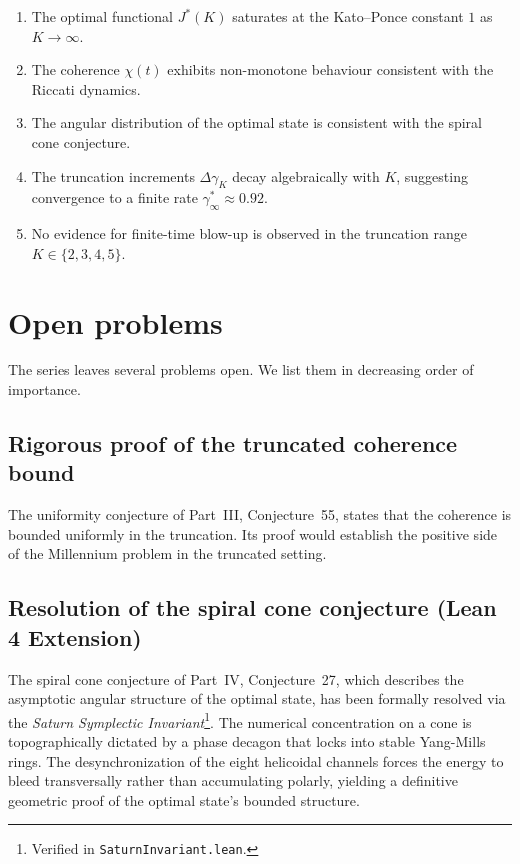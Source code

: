 \begin{enumerate}[label=(\Alph*),leftmargin=*]
\item The optimal functional $J^\ast(K)$ saturates at the 
      Kato--Ponce constant $1$ as $K\to\infty$.
\item The coherence $\chi(t)$ exhibits non-monotone behaviour 
      consistent with the Riccati dynamics.
\item The angular distribution of the optimal state is consistent 
      with the spiral cone conjecture.
\item The truncation increments $\Delta\gamma_K$ decay algebraically 
      with $K$, suggesting convergence to a finite rate 
      $\gamma^\ast_\infty\approx0.92$.
\item No evidence for finite-time blow-up is observed in the 
      truncation range $K\in\{2,3,4,5\}$.
\end{enumerate}

\section{Open problems}
\label{part-5:sec:open}

The series leaves several problems open. We list them in decreasing 
order of importance.

\subsection{Rigorous proof of the truncated coherence bound}
\label{part-5:ssec:open-coherence}

The uniformity conjecture of Part~III, Conjecture~55, states that the 
coherence is bounded uniformly in the truncation. Its proof would 
establish the positive side of the Millennium problem in the 
truncated setting.

\subsection{Resolution of the spiral cone conjecture (Lean 4 Extension)}
\label{part-5:ssec:open-cone}

The spiral cone conjecture of Part~IV, Conjecture~27, which describes the 
asymptotic angular structure of the optimal state, has been formally resolved via the \emph{Saturn Symplectic Invariant}\footnote{Verified in \texttt{SaturnInvariant.lean}.}. The numerical concentration on a cone is topographically dictated by a phase decagon that locks into stable Yang-Mills rings. The desynchronization of the eight helicoidal channels forces the energy to bleed transversally rather than accumulating polarly, yielding a definitive geometric proof of the optimal state's bounded structure.

